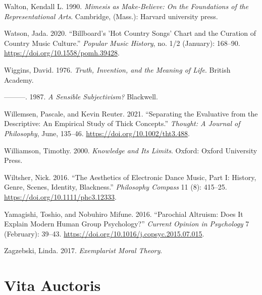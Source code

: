 \documentclass[12pt]{book}
\newenvironment{CSLReferences}%
  {\setlength{\parindent}{0pt}%
   \setlength{\leftskip}{0pt}%
   \setlength{\parskip}{0pt}}%
  {\par}
\theoremstyle{definition}
\theoremstyle{remark}
\newcommand{\vitaauctoris}{
  \chapter*{Vita Auctoris}
  \addcontentsline{toc}{chapter}{Vita Auctoris}
  \doublespacing
}
\begin{document}
\begin{CSLReferences}{1}{0}
Walton, Kendall L. 1990. \emph{Mimesis as {Make-Believe}: {On} the {Foundations} of the {Representational Arts}}. Cambridge, (Mass.): Harvard university press.

Watson, Jada. 2020. {``Billboard's '{Hot Country Songs}' Chart and the Curation of Country Music Culture.''} \emph{Popular Music History}, no. 1/2 (January): 168--90. \url{https://doi.org/10.1558/pomh.39428}.

Wiggins, David. 1976. \emph{Truth, {Invention}, and the {Meaning} of {Life}}. British Academy.

---------. 1987. \emph{A {Sensible Subjectivism}?} Blackwell.

Willemsen, Pascale, and Kevin Reuter. 2021. {``Separating the Evaluative from the Descriptive: {An} Empirical Study of Thick Concepts.''} \emph{Thought: A Journal of Philosophy}, June, 135--46. \url{https://doi.org/10.1002/tht3.488}.

Williamson, Timothy. 2000. \emph{Knowledge and {Its Limits}}. Oxford: Oxford University Press.

Wiltsher, Nick. 2016. {``The {Aesthetics} of {Electronic Dance Music}, {Part I}: {History}, {Genre}, {Scenes}, {Identity}, {Blackness}.''} \emph{Philosophy Compass} 11 (8): 415--25. \url{https://doi.org/10.1111/phc3.12333}.

Yamagishi, Toshio, and Nobuhiro Mifune. 2016. {``Parochial {Altruism}: {Does It Explain Modern Human Group Psychology}?''} \emph{Current Opinion in Psychology} 7 (February): 39--43. \url{https://doi.org/10.1016/j.copsyc.2015.07.015}.

Zagzebski, Linda. 2017. \emph{Exemplarist {Moral Theory}}.

\end{CSLReferences}


\vitaauctoris
\end{document}
